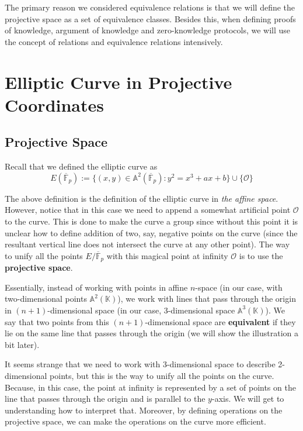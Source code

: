 \documentclass[../lecture-notes.tex]{subfiles}
\begin{document}
The primary reason we considered equivalence relations is that we will define the projective space as a set of equivalence classes. Besides this, when defining proofs of knowledge, argument of knowledge and zero-knowledge protocols, we will use the concept of relations and equivalence relations intensively.

\section{Elliptic Curve in Projective Coordinates}
\subsection{Projective Space}

Recall that we defined the elliptic curve as 
\begin{equation}    
    E(\overline{\mathbb{F}}_p) := \{(x,y) \in \mathbb{A}^2(\overline{\mathbb{F}}_p): y^2 = x^3+ax+b\} \cup \{\mathcal{O}\}
\end{equation}

The above definition is the definition of the elliptic curve in \textit{the affine space}. However, notice that in this case 
we need to append a somewhat artificial point $\mathcal{O}$ to the curve. This is done to make the curve a group since without 
this point it is unclear how to define addition of two, say, negative points on the curve (since the resultant vertical line
does not intersect the curve at any other point). The way to unify all the points $E/\overline{\mathbb{F}}_p$ with this 
magical point at infinity $\mathcal{O}$ is to use the \textbf{projective space}.

Essentially, instead of working with points in affine $n$-space (in our case, with two-dimensional points $\mathbb{A}^2(\mathbb{K})$), we work with lines that pass through the origin in 
$(n+1)$-dimensional space (in our case, 3-dimensional space $\mathbb{A}^3(\mathbb{K})$). We say that two points from this $(n+1)$-dimensional space are \textbf{equivalent} if they lie on the same line that passes through the origin (we will show the illustration a bit later). 

It seems strange that we need to work with 3-dimensional space to describe 2-dimensional points, but this is the way to unify all the points on the curve. Because, in this case, the point at infinity is represented by a set of points on the line that passes through the origin and is parallel to the
$y$-axis. We will get to understanding how to interpret that. Moreover, by defining operations on the projective space, we can make the operations on the curve more efficient.
\end{document}
